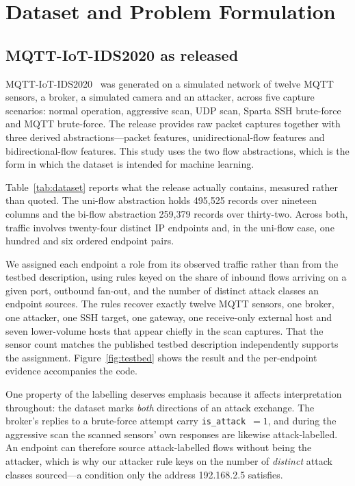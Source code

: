 \section{Dataset and Problem Formulation}
\label{sec:dataset}

\subsection{MQTT-IoT-IDS2020 as released}

MQTT-IoT-IDS2020~\cite{hindy2020mqttdataset} was generated on a simulated
network of twelve MQTT sensors, a broker, a simulated camera and an attacker,
across five capture scenarios: normal operation, aggressive scan, UDP scan,
Sparta SSH brute-force and MQTT brute-force. The release provides raw packet
captures together with three derived abstractions---packet features,
unidirectional-flow features and bidirectional-flow features. This study uses
the two flow abstractions, which is the form in which the dataset is intended
for machine learning.

Table~\ref{tab:dataset} reports what the release actually contains, measured
rather than quoted. The uni-flow abstraction holds 495{,}525 records over
nineteen columns and the bi-flow abstraction 259{,}379 records over
thirty-two. Across both, traffic involves twenty-four distinct IP endpoints
and, in the uni-flow case, one hundred and six ordered endpoint pairs.

We assigned each endpoint a role from its observed traffic rather than from the
testbed description, using rules keyed on the share of inbound flows arriving
on a given port, outbound fan-out, and the number of distinct attack classes an
endpoint sources. The rules recover exactly twelve MQTT sensors, one broker,
one attacker, one SSH target, one gateway, one receive-only external host and
seven lower-volume hosts that appear chiefly in the scan captures. That the
sensor count matches the published testbed description independently supports
the assignment. Figure~\ref{fig:testbed} shows the result and the per-endpoint
evidence accompanies the code.

One property of the labelling deserves emphasis because it affects
interpretation throughout: the dataset marks \emph{both} directions of an
attack exchange. The broker's replies to a brute-force attempt carry
\texttt{is\_attack}~$=1$, and during the aggressive scan the scanned sensors'
own responses are likewise attack-labelled. An endpoint can therefore source
attack-labelled flows without being the attacker, which is why our attacker
rule keys on the number of \emph{distinct} attack classes sourced---a condition
only the address 192.168.2.5 satisfies.

